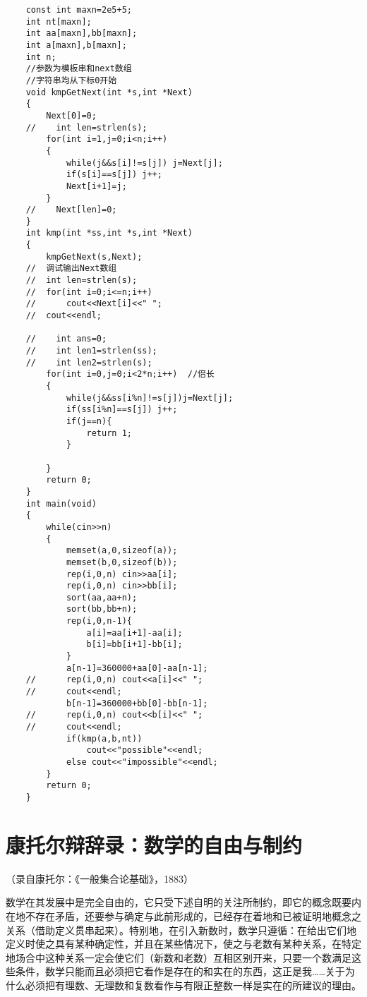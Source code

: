 \begin{lstlisting}
    const int maxn=2e5+5; 
    int nt[maxn];
    int aa[maxn],bb[maxn];
    int a[maxn],b[maxn];
    int n;
    //参数为模板串和next数组
    //字符串均从下标0开始
    void kmpGetNext(int *s,int *Next)
    {
        Next[0]=0;
    //    int len=strlen(s);
        for(int i=1,j=0;i<n;i++)
        {
            while(j&&s[i]!=s[j]) j=Next[j];
            if(s[i]==s[j]) j++;
            Next[i+1]=j;
        }
    //    Next[len]=0;
    }
    int kmp(int *ss,int *s,int *Next)
    {
        kmpGetNext(s,Next);
    //  调试输出Next数组
    //	int len=strlen(s);
    //	for(int i=0;i<=n;i++)
    //		cout<<Next[i]<<" ";
    //	cout<<endl; 
    
    //    int ans=0;
    //    int len1=strlen(ss);
    //    int len2=strlen(s);
        for(int i=0,j=0;i<2*n;i++)  //倍长 
        {
            while(j&&ss[i%n]!=s[j])j=Next[j];
            if(ss[i%n]==s[j]) j++;
            if(j==n){
                return 1;
            }
               
        }
        return 0;
    }
    int main(void)
    {
        while(cin>>n)
        {
            memset(a,0,sizeof(a));
            memset(b,0,sizeof(b));
            rep(i,0,n) cin>>aa[i];
            rep(i,0,n) cin>>bb[i];
            sort(aa,aa+n);
            sort(bb,bb+n);
            rep(i,0,n-1){
                a[i]=aa[i+1]-aa[i];
                b[i]=bb[i+1]-bb[i];
            }
            a[n-1]=360000+aa[0]-aa[n-1];
    //		rep(i,0,n) cout<<a[i]<<" ";
    //		cout<<endl;
            b[n-1]=360000+bb[0]-bb[n-1];
    //		rep(i,0,n) cout<<b[i]<<" ";
    //		cout<<endl;
            if(kmp(a,b,nt))
                cout<<"possible"<<endl;
            else cout<<"impossible"<<endl;
        }
        return 0;
    }
\end{lstlisting}

\chapter{康托尔辩辞录：数学的自由与制约}

（录自康托尔：《一般集合论基础》，1883）

数学在其发展中是完全自由的，它只受下述自明的关注所制约，即它的概念既要内在地不存在矛盾，还要参与确定与此前形成的，已经存在着地和已被证明地概念之关系（借助定义贯串起来）。特别地，在引入新数时，数学只遵循：在给出它们地定义时使之具有某种确定性，并且在某些情况下，使之与老数有某种关系，在特定地场合中这种关系一定会使它们（新数和老数）互相区别开来，只要一个数满足这些条件，数学只能而且必须把它看作是存在的和实在的东西，这正是我……关于为什么必须把有理数、无理数和复数看作与有限正整数一样是实在的所建议的理由。

